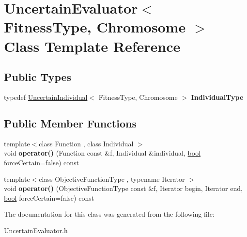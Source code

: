 \hypertarget{classUncertainEvaluator}{}\section{Uncertain\+Evaluator$<$ Fitness\+Type, Chromosome $>$ Class Template Reference}
\label{classUncertainEvaluator}
\subsection*{Public Types}
\begin{DoxyCompactItemize}
\item 
typedef \hyperlink{classUncertainIndividual}{Uncertain\+Individual}$<$ Fitness\+Type, Chromosome $>$ {\bfseries Individual\+Type}\hypertarget{classUncertainEvaluator_ac9f7eea3bafcd180f6f2932f41803b65}{}\label{classUncertainEvaluator_ac9f7eea3bafcd180f6f2932f41803b65}

\end{DoxyCompactItemize}
\subsection*{Public Member Functions}
\begin{DoxyCompactItemize}
\item 
{\footnotesize template$<$class Function , class Individual $>$ }\\void {\bfseries operator()} (Function const \&f, Individual \&individual, \hyperlink{classbool}{bool} force\+Certain=false) const \hypertarget{classUncertainEvaluator_a19e98676ef864cc0b72f974b4cce645d}{}\label{classUncertainEvaluator_a19e98676ef864cc0b72f974b4cce645d}

\item 
{\footnotesize template$<$class Objective\+Function\+Type , typename Iterator $>$ }\\void {\bfseries operator()} (Objective\+Function\+Type const \&f, Iterator begin, Iterator end, \hyperlink{classbool}{bool} force\+Certain=false) const \hypertarget{classUncertainEvaluator_abcb8598d74d87ff4bfb9eb277cdb763c}{}\label{classUncertainEvaluator_abcb8598d74d87ff4bfb9eb277cdb763c}

\end{DoxyCompactItemize}


The documentation for this class was generated from the following file\+:\begin{DoxyCompactItemize}
\item 
Uncertain\+Evaluator.\+h\end{DoxyCompactItemize}
